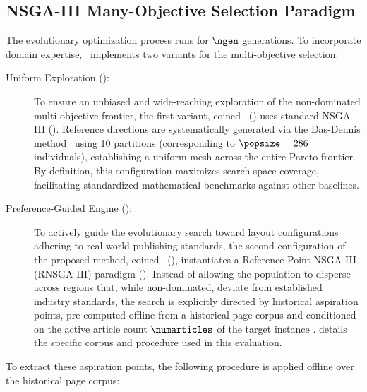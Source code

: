 \subsection{NSGA-III Many-Objective Selection Paradigm}
\label{sec:many-objective_optimization}

The evolutionary optimization process runs for $\ngen$ generations. To incorporate domain expertise, \methodNameGeneral\ implements two variants for the multi-objective selection:
\begin{description}
    \item[Uniform Exploration (\methodNameUniform):] To ensure an unbiased and wide-reaching exploration of the non-dominated multi-objective frontier, the first variant, coined \methodNameUniformLong\ (\methodNameUniform) uses standard NSGA-III (). Reference directions are systematically generated via the Das-Dennis method~\cite{das-dennis} using 10 partitions (corresponding to $\popsize = 286$ individuals), establishing a uniform mesh across the entire Pareto frontier. By definition, this configuration maximizes search space coverage, facilitating standardized mathematical benchmarks against other baselines.

    \item[Preference-Guided Engine (\methodName):] To actively guide the evolutionary search toward layout configurations adhering to real-world publishing standards, the second configuration of the proposed method, coined \methodNameLong\ (\methodName), instantiates a Reference-Point NSGA-III (RNSGA-III) paradigm (). Instead of allowing the population to disperse across regions that, while non-dominated, deviate from established industry standards, the search is explicitly directed by historical aspiration points, pre-computed offline from a historical page corpus and conditioned on the active article count $\numarticles$ of the target instance \instance.  details the specific corpus and procedure used in this evaluation.
\end{description}
To extract these aspiration points, the following procedure is applied offline over the historical page corpus:
